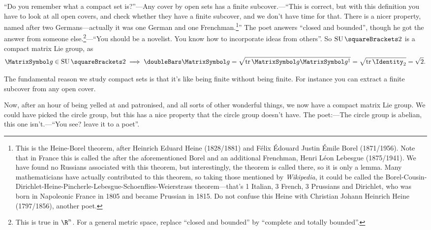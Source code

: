 \documentclass[10pt, a4paper, twoside]{lecturenotes}
\newcommand{\Rn}{{\R^n}}
\begin{document}
\begin{lecture}[date=2013-04-23]
``Do you remember what a compact set is?''---Any cover by open sets has a finite subcover.---``This is correct, but with this definition you have to look at all open covers, and check whether they have a finite subcover, and we don't have time for that. There is a nicer property, named after two Germans---actually it was one German and one Frenchman.\footnote{This is the Heine-Borel theorem, after Heinrich Eduard Heine (1828/1881) and Félix Édouard Justin Émile Borel (1871/1956). Note that in France this is called the  after the aforementioned Borel and an additional Frenchman, Henri Léon Lebesgue (1875/1941). We have found no Russians associated with this theorem, but interestingly, the theorem is called  there, so it is only a lemma. Many mathematicians have actually contributed to this theorem, so taking those mentioned by \emph{Wikipedia}, it could be called the Borel-Cousin-Dirichlet-Heine-Pincherle-Lebesgue-Schoenflies-Weierstrass theorem---that's 1 Italian, 3 French, 3 Prussians and Dirichlet, who was born in Napoleonic France in 1805 and became  Prussian in 1815. Do not confuse this Heine with Christian Johann Heinrich Heine (1797/1856), another poet.}'' The poet answers ``closed and bounded'', though he got the answer from someone else.\footnote{This is true in $\Rn$. For a general metric space, replace ``closed and bounded'' by ``complete and totally bounded''.}---``You should be a novelist. You know how to incorporate ideas from others''. So $\SpecialUnitaryGroup\of{2}$ is a compact matrix Lie group, as \[
\matg\in\SpecialUnitaryGroup\of 2 \Implies \FrobeniusNorm\matg = \sqrt{\Trace \matg\adj\matg} = \sqrt{\Trace \Identity_2} = \sqrt{2}\text.
\]

The fundamental reason we study compact sets is that it's like being finite without being finite. For instance you can extract a finite subcover from any open cover.

Now, after an hour of being yelled at and patronised, and all sorts of other wonderful things,  we now have a compact matrix Lie group. We could have picked the circle group, but this has a nice property that the circle group doesn't have. The poet:---The circle group is abelian, this one isn't.---``You see? leave it to a poet''.
\end{lecture}
\end{document}

